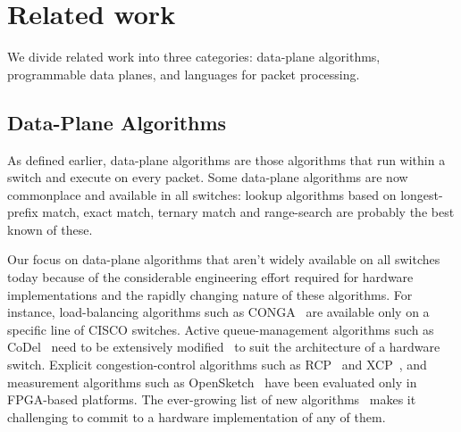 \section{Related work}
\label{s:related}

We divide related work into three categories: data-plane algorithms, programmable
data planes, and languages for packet processing.

\subsection{Data-Plane Algorithms} 
As defined earlier, data-plane algorithms are those algorithms that run within
a switch and execute on every packet. Some data-plane algorithms are now
commonplace and available in all switches: lookup algorithms based on
longest-prefix match, exact match, ternary match and range-search are probably
the best known of these.

  Our focus on data-plane algorithms that aren't widely available on all
switches today because of the considerable engineering effort required for
hardware implementations and the rapidly changing nature of these algorithms.
For instance, load-balancing algorithms such as CONGA~\cite{conga} are
available only on a specific line of CISCO switches.  Active queue-management
algorithms such as CoDel~\cite{codel} need to be extensively
modified~\cite{pie} to suit the architecture of a hardware switch.  Explicit
congestion-control algorithms such as RCP~\cite{rcp} and XCP~\cite{xcp}, and
measurement algorithms such as OpenSketch~\cite{opensketch} have been evaluated
only in FPGA-based platforms.  The ever-growing list of new
algorithms~\cite{pdq, d3, detail} makes it challenging to commit to a hardware
implementation of any of them.

